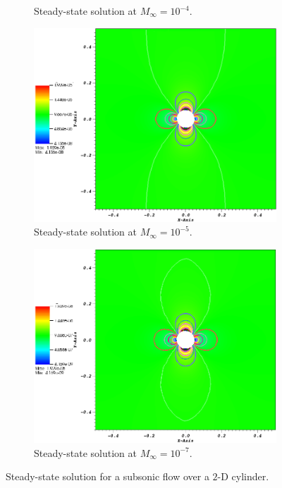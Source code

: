 \documentclass[preprint,10pt]{elsarticle}
\begin{document}
\begin{figure}[H]
\begin{subfigure}[b]{0.495\textwidth}
                \caption{Steady-state solution at $M_{\infty}=10^{-4}$.}
                \label{fig:cyl_1em4}
        \end{subfigure}    
        \begin{subfigure}[b]{0.495\textwidth}
                \centering
                \includegraphics[width=\textwidth]{CylinderMach1em5.png}
                \caption{Steady-state solution at $M_{\infty}=10^{-5}$.}
                \label{fig:cyl_1em5}
        \end{subfigure}
        \begin{subfigure}[b]{0.495\textwidth}
                \centering
                \includegraphics[width=\textwidth]{CylinderMach1em7.png}
                \caption{Steady-state solution at $M_{\infty}=10^{-7}$.}
                \label{fig:cyl_1em7}
        \end{subfigure}
        \caption{Steady-state solution for a subsonic flow over a $2$-D cylinder.}\label{fig:cylinder}
\end{figure}
\end{document}
